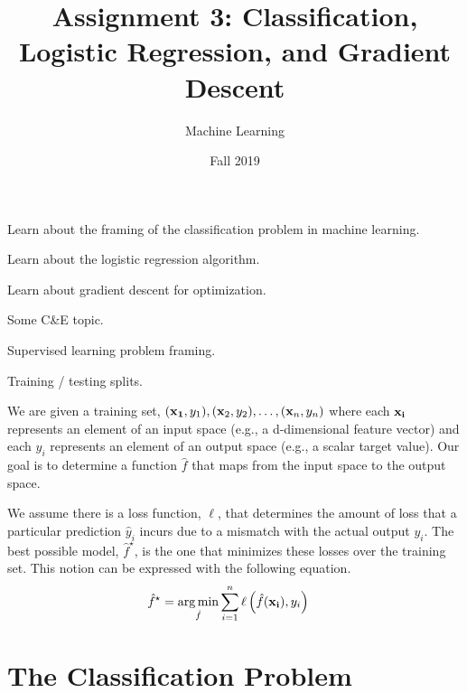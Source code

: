 \documentclass[assignment03_Solutions]{subfiles}
\title{Assignment 3: Classification, Logistic Regression, and Gradient Descent}
\author{Machine Learning}
\date{Fall 2019}
\begin{document}
\maketitle
\thispagestyle{firstpage}


\begin{learningobjectives}
\bi
\item Learn about the framing of the classification problem in machine learning.
\item Learn about the logistic regression algorithm.
\item Learn about gradient descent for optimization.
\item Some C\&E topic.
\ei
\end{learningobjectives}

\begin{priorknowledge}
\bi
\item Supervised learning problem framing.
\item Training / testing splits.
\ei
\end{priorknowledge}
\vspace{1em}


\begin{recall}
We are given a training set, $(\mathbf{x_1}, y_1), (\mathbf{x}_2, y_2), \ldots, (\mathbf{x}_n, y_n)$ where each $\mathbf{x_i}$ represents an element of an input space (e.g., a d-dimensional feature vector) and each $y_i$ represents an element of an output space (e.g., a scalar target value).  Our goal is to determine a function $\hat{f}$ that maps from the input space to the output space.

We assume there is a loss function, $\ell$, that determines the amount of loss that a particular prediction $\hat{y}_i$ incurs due to a mismatch with the actual output $y_i$.  The best possible model, $\hat{f}^\star$, is the one that minimizes these losses over the training set.  This notion can be expressed with the following equation.
\begin{align}
\hat{f}^\star &= \operatorname*{arg\,min}_{\hat{f}} \sum_{i=1}^n \ell \left ( \hat{f}(\mathbf{x_i}), y_i \right )
\end{align} 
\end{recall}


\section{The Classification Problem}
\end{document}

